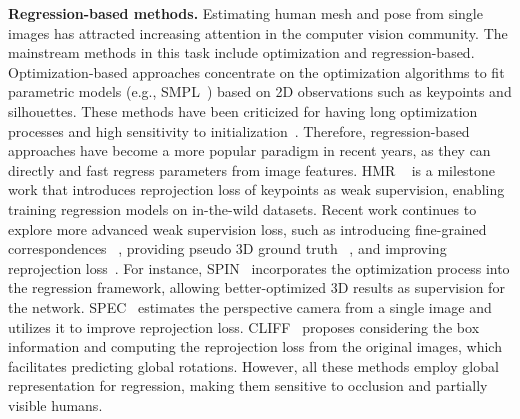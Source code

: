 \documentclass[10pt,twocolumn,letterpaper]{article}
\begin{document}
\textbf{Regression-based methods.} Estimating human mesh and pose from single images has attracted increasing attention in the computer vision community.  The mainstream methods in this task include optimization and regression-based. Optimization-based approaches concentrate on the optimization algorithms to fit parametric models (e.g., SMPL~\cite{loper2015smpl}) based on 2D observations such as keypoints and silhouettes. These methods have been criticized for having long optimization processes and high sensitivity to initialization~\cite{kolotouros2019learning}. Therefore, regression-based approaches  have become a more popular paradigm in recent years, as they can directly and fast regress parameters from image features.  HMR ~\cite{kanazawa2018end} is a milestone work that introduces reprojection loss of keypoints as weak supervision, enabling training regression models on in-the-wild datasets.  Recent work continues to explore more advanced weak supervision loss, such as introducing fine-grained correspondences ~\cite{omran2018neural,rueegg2020chained,xu2019denserac,zhang2020learning}, providing pseudo 3D ground truth ~\cite{kolotouros2019learning,joo2020exemplar}, and improving reprojection loss~\cite{kocabas2021spec,li2022cliff}. For instance, SPIN~\cite{kolotouros2019learning} incorporates the optimization process into the regression framework, allowing better-optimized 3D results as supervision for the network. SPEC~\cite{kocabas2021spec} estimates the perspective camera from a single image and utilizes it to improve reprojection loss. CLIFF~\cite{li2022cliff} proposes considering the box information and computing the reprojection loss from the original images, which facilitates predicting global rotations. However, all these methods employ global representation for regression, making them sensitive to occlusion and partially visible humans.  
\end{document}

